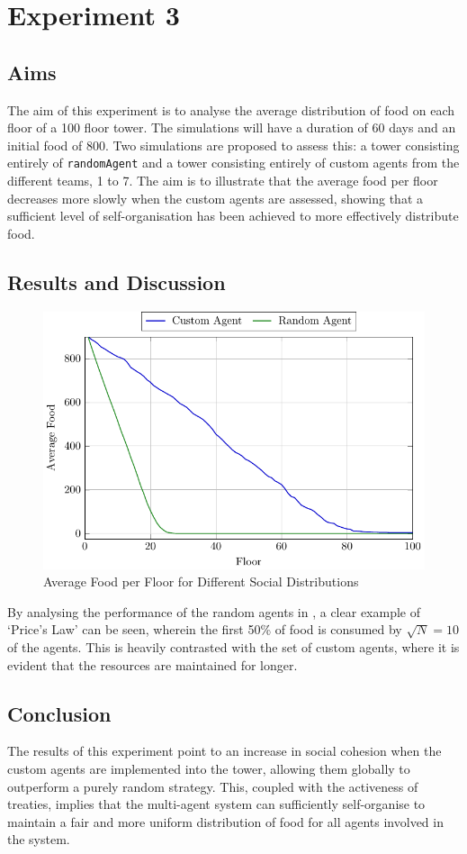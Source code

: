 \section{Experiment 3}
\label{sec: Experiment 3}
\subsection{Aims}
\label{subsec: E3-Aims}
The aim of this experiment is to analyse the average distribution of food on each floor of a 100 floor tower.
The simulations will have a duration of 60 days and an initial food of 800. Two simulations are proposed to assess this: a tower consisting entirely of \texttt{randomAgent} and a tower consisting entirely of custom agents from the different teams, 1 to 7. The aim is to illustrate that the average food per floor decreases more slowly when the custom agents are assessed, showing that a sufficient level of self-organisation has been achieved to more effectively distribute food.

\subsection{Results and Discussion}
\label{subsec: E3-Results and Discussion}
\begin{figure}[H]
    \centering
    \includegraphics[width=.8\linewidth]{images/SOMAS_price.pdf}
    \caption{Average Food per Floor for Different Social Distributions}
    \label{fig:priceLaw}
\end{figure}

By analysing the performance of the random agents in , a clear example of `Price's Law' can be seen, wherein the first 50\% of food is consumed by $\sqrt{\mathit{N}} = 10$ of the agents. This is heavily contrasted with the set of custom agents, where it is evident that the resources are maintained for longer. 

\subsection{Conclusion}
\label{subsec: E3-Conclusion}
The results of this experiment point to an increase in social cohesion when the custom agents are implemented into the tower, allowing them globally to outperform a purely random strategy. This, coupled with the activeness of treaties, implies that the multi-agent system can sufficiently self-organise to maintain a fair and more uniform distribution of food for all agents involved in the system. 

